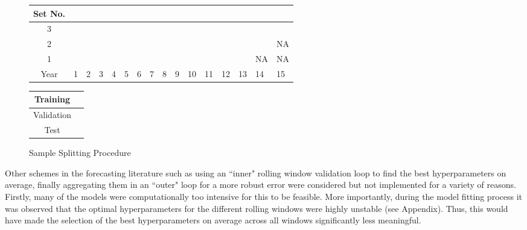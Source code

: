 \documentclass{article}
\begin{document}
\begin{figure}[!htb]
	\begin{center}
		\begin{tabular}{|c|p{0.40cm}p{0.40cm}p{0.40cm}p{0.40cm}p{0.40cm}p{0.40cm}p{0.40cm}p{0.40cm}p{0.40cm}p{0.40cm}p{0.40cm}p{0.40cm}p{0.40cm}p{0.40cm}p{0.40cm}|}
			\hline
			Set No. &&&&&&&&&&&&&&& \\
			\hline
			3 & \cellcolor{cyan} & \cellcolor{cyan} & \cellcolor{cyan} & \cellcolor{cyan} & \cellcolor{cyan} & \cellcolor{cyan} & \cellcolor{cyan} & \cellcolor{cyan} & \cellcolor{cyan} &
			\cellcolor{pink} & \cellcolor{pink} & \cellcolor{pink} & \cellcolor{pink} & \cellcolor{pink} & 	
			\cellcolor{olive} \\
			2 & \cellcolor{cyan} & \cellcolor{cyan} & \cellcolor{cyan} & \cellcolor{cyan} & \cellcolor{cyan} & \cellcolor{cyan} & \cellcolor{cyan} & \cellcolor{cyan} &
			\cellcolor{pink} & \cellcolor{pink} & \cellcolor{pink} & \cellcolor{pink} & \cellcolor{pink} & 	
			\cellcolor{olive} & NA  \\
			1 & \cellcolor{cyan} & \cellcolor{cyan} & \cellcolor{cyan} & \cellcolor{cyan} & \cellcolor{cyan} & \cellcolor{cyan} & \cellcolor{cyan} &
			\cellcolor{pink} & \cellcolor{pink} & \cellcolor{pink} & \cellcolor{pink} & \cellcolor{pink} & 	
			\cellcolor{olive} & NA & NA \\
			\hline
			Year & 1 & 2 & 3 & 4 & 5 & 6 & 7 & 8 & 9 & 10 & 11 & 12 & 13 & 14 & 15\\
			\hline
		\end{tabular}
		\medskip
		\begin{tabular}{|c|p{0.40cm}|}
			\hline
			Training & \cellcolor{cyan} \\
			\hline
			Validation & \cellcolor{pink} \\
			\hline
			Test & \cellcolor{olive} \\
			\hline
		\end{tabular}
	\end{center}
	\caption{Sample Splitting Procedure}
	\label{sample_split_diag}
\end{figure}

Other schemes in the forecasting literature such as using an ``inner" rolling window validation loop to find the best hyperparameters on average, finally aggregating them in an ``outer" loop for a more robust error were considered but not implemented for a variety of reasons. Firstly, many of the models were computationally too intensive for this to be feasible. More importantly, during the model fitting process it was observed that the optimal hyperparameters for the different rolling windows were highly unstable (see Appendix). Thus, this would have made the selection of the best hyperparameters on average across all windows significantly less meaningful.
\end{document}

